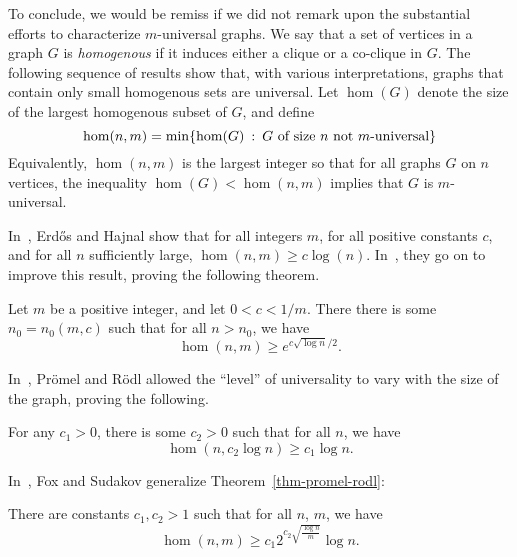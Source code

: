 To conclude, we would be remiss if we did not remark upon the substantial efforts to characterize $m$-universal graphs. We say that a set of vertices in a graph $G$ is \emph{homogenous} if it induces either a clique or a co-clique in $G$. The following sequence of results show that, with various interpretations, graphs that contain only small homogenous sets are universal.
Let $\hom(G)$ denote the size of the largest homogenous subset of $G$, and define
\[
	\operatorname{hom}(n,m)
	=
	\min\{\operatorname{hom}(G) \::\: \text{$G$ of size $n$ not $m$-universal}\}
\]
Equivalently, $\hom(n,m)$ is the largest integer so that for all graphs $G$ on $n$ vertices, the inequality $\hom(G) < \hom(n,m)$ implies that $G$ is $m$-universal.

In~\cite{erdos:on-spanned-subgraphs:}, Erd\H{o}s and Hajnal show that for all integers $m$, for all positive constants $c$, and for all $n$ sufficiently large, $\hom(n,m) \ge c \log(n)$. In~\cite{erdos:ramsey-type-the:}, they go on to improve this result, proving the following theorem.
\begin{theorem}
\label{thm-erdos-hajnal}
	Let $m$ be a positive integer, and let $0 < c < 1/m$. There there is some $n_0 = n_0(m,c)$ such that for all $n > n_0$, we have 
	\[
		\hom(n,m) \ge e^{c\sqrt{\log n}/2}.	
	\]
\end{theorem}

In~\cite{promel:non-ramsey-graphs:}, Pr\"{o}mel and R\"{o}dl allowed the ``level'' of universality to vary with the size of the graph, proving the following.
\begin{theorem}
\label{thm-promel-rodl}
For any $c_1 > 0$, there is some $c_2 > 0$ such that for all $n$, we have
\[
	\hom(n,c_2 \log n) \ge c_1 \log n.
\]
\end{theorem}
In~\cite{fox:induced-Ramsey-type:}, Fox and Sudakov generalize Theorem~\ref{thm-promel-rodl}:
\begin{theorem}
\label{thm-fox-sudakov}
There are constants $c_1, c_2 > 1$ such that for all $n$, $m$, we have 
\[
	\hom(n,m) \ge c_1 2^{c_2 \sqrt{\frac{\log n}{m}}} \log n.
\]
\end{theorem}

